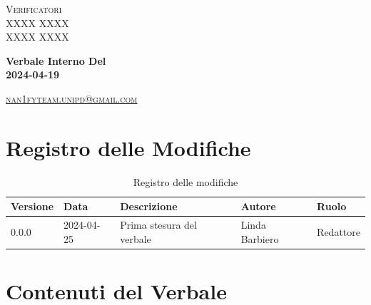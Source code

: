 \documentclass[8pt]{article}
\begin{document}
\begin{titlepage}
\begin{minipage}[t]{0.47\textwidth}
		{\large{\textsc{Verificatori}}
			\vspace{3mm}
			{\\\large{\textsc{XXXX XXXX}\\}} %
			{\large{\textsc{XXXX XXXX}}}
			
		}
		\vspace{4mm}\vspace{4mm}
	\end{minipage}
	\vspace{4cm}
	\begin{center}
		\begin{flushright}
			{\fontsize{30pt}{52pt}\selectfont \textbf{Verbale Interno Del\\2024-04-19\\}} %
		\end{flushright}
		\vspace{3cm}
	\end{center}
	\vspace{8 cm}
	{\small \textsc{\href{mailto: nan1fyteam.unipd@gmail.com}{nan1fyteam.unipd@gmail.com}}}
\end{titlepage}
\pagestyle{mystyle}
\section*{Registro delle Modifiche}
\begin{table}[ht!]	
	\centering
	\begin{tabular}{p{1.2cm} p{2cm} p{6cm} p{3cm} p{2cm}}
		\toprule
		\textbf{Versione}& \textbf{Data} & \textbf{Descrizione} & \textbf{Autore} & \textbf{Ruolo} \\
		\midrule
		0.0.0 & 2024-04-25 & Prima stesura del verbale & Linda Barbiero & Redattore \\
		\bottomrule
	\end{tabular}
	\caption{Registro delle modifiche}
	\label{table:Registro delle modifiche}
\end{table}
\newpage
\tableofcontents
\clearpage
\newpage
\justifying
\section{Contenuti del Verbale}
\end{document}
